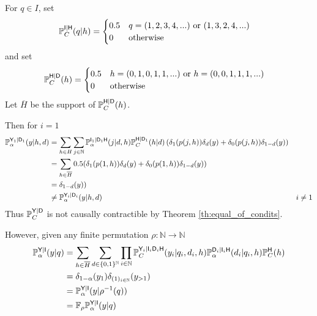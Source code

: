 \begin{example}
For $q\in I$, set
\begin{align}
    \mathbb{P}_C^{\mathsf{I}|\mathsf{H}}(q|h)&= \begin{cases}
        0.5 & q=(1,2,3,4,...) \text{ or } (1,3,2,4,...)\\
        0&\text{otherwise}
    \end{cases}
\end{align}
and set
\begin{align}
    \mathbb{P}_C^{\mathsf{H}|\mathsf{D}}(h) &= \begin{cases}
        0.5 & h=(0,1,0,1,1,...)\text{ or }h=(0,0,1,1,1,...)\\
        0 &\text{otherwise}
    \end{cases}
\end{align}
Let $\overline{H}$ be the support of $\mathbb{P}_C^{\mathsf{H}|\mathsf{D}}(h)$.

Then for $i=1$
\begin{align}
    \mathbb{P}_\alpha^{\mathsf{Y}_1|\mathsf{D}_1}(y|h,d) &= \sum_{h\in H} \sum_{j\in \mathbb{N}} \mathbb{P}_\alpha^{\mathsf{I}_1|\mathsf{D}_1\mathsf{H}}(j|d,h)\mathbb{P}_C^{\mathsf{H}|\mathsf{D}_1}(h|d)\left(\delta_1(p(j,h))\delta_d(y) + \delta_0(p(j,h))\delta_{1-d}(y)\right)\\
    &= \sum_{h\in \overline{H}} 0.5( \delta_1(p(1,h))\delta_d(y) + \delta_0(p(1,h))\delta_{1-d}(y))\\
    &= \delta_{1-d}(y))\\
    &\neq  \mathbb{P}_\alpha^{\mathsf{Y}_i|\mathsf{D}_i}(y|h,d) & i\neq 1
\end{align}
Thus $\mathbb{P}_C^{\mathsf{Y}|\mathsf{D}}$ is not causally contractible by Theorem \ref{th:equal_of_condits}. 

However, given any finite permutation $\rho:\mathbb{N}\to\mathbb{N}$
\begin{align}
    \mathbb{P}_\alpha^{\mathsf{Y}|\mathsf{I}}(y|q) &= \sum_{h\in \overline{H}}\sum_{d\in\{0,1\}^{\mathbb{N}}} \prod_{i\in \mathbb{N}} \mathbb{P}_C^{\mathsf{Y}_i|\mathsf{I}_i\mathsf{D}_i\mathsf{H}}(y_i|q_i,d_i,h) \mathbb{P}_\alpha^{\mathsf{D}_i|\mathsf{I}_i\mathsf{H}}(d_i|q_i,h)\mathbb{P}_C^{\mathsf{H}}(h)\\
    &= \delta_{1-\alpha}(y_1)\delta_{(1)_{i\in\mathbb{N}}}(y_{>1})\\
    &= \mathbb{P}_\alpha^{\mathsf{Y}|\mathsf{I}}(y|\rho^{-1}(q))\\
    &= \mathbb{F}_{\rho}\mathbb{P}_\alpha^{\mathsf{Y}|\mathsf{I}}(y|q)
\end{align}
\end{example}
